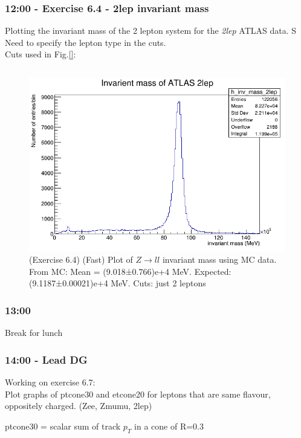 \subsubsection*{12:00 - Exercise 6.4 - 2lep invariant mass}
Plotting the invariant mass of the 2 lepton system for the \textit{2lep} ATLAS data. S
\\
Need to specify the lepton type in the cuts.
\\
Cuts used in Fig.\ref{}:
\begin{lstlisting}

\end{lstlisting}
\begin{figure}[h!]
    \centering
	\includegraphics[width=0.85\linewidth]{plots/11-02-2021/2lep-fast_no-cuts_inv-mass_0-150GeV_11-02-21.png}
	\caption{(Exercise 6.4) (Fast) Plot of $Z \rightarrow ll$ invariant mass using MC data. From MC: Mean = (9.018±0.766)e+4 MeV. Expected: (9.1187±0.00021)e+4 MeV.  Cuts: just 2 leptons}
	\label{fig:zll_inv-mass_50-150GeV_11-02-21_11:12}
\end{figure}

\subsubsection*{\textbf{13:00}}
Break for lunch

\subsubsection*{\textbf{14:00} - Lead DG}
Working on exercise 6.7:\\
Plot graphs of ptcone30 and etcone20 for leptons that are same flavour, oppositely charged. (Zee, Zmumu, 2lep)

ptcone30 = scalar sum of track $p_T$ in a cone of R=0.3\\

